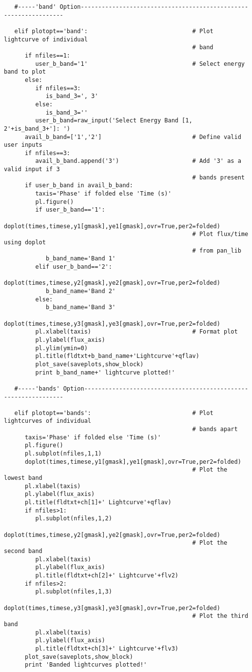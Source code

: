 \begin{verbatim}
   #-----'band' Option-----------------------------------------------------------------

   elif plotopt=='band':                              # Plot lightcurve of individual
                                                      # band
      if nfiles==1:
         user_b_band='1'                              # Select energy band to plot
      else:
         if nfiles==3:
            is_band_3=', 3'
         else:
            is_band_3=''
         user_b_band=raw_input('Select Energy Band [1, 2'+is_band_3+']: ')
      avail_b_band=['1','2']                          # Define valid user inputs
      if nfiles==3:
         avail_b_band.append('3')                     # Add '3' as a valid input if 3
                                                      # bands present
      if user_b_band in avail_b_band:
         taxis='Phase' if folded else 'Time (s)'
         pl.figure()
         if user_b_band=='1':
            doplot(times,timese,y1[gmask],ye1[gmask],ovr=True,per2=folded)
                                                      # Plot flux/time using doplot
                                                      # from pan_lib
            b_band_name='Band 1'
         elif user_b_band=='2':
            doplot(times,timese,y2[gmask],ye2[gmask],ovr=True,per2=folded)
            b_band_name='Band 2'
         else:
            b_band_name='Band 3'
            doplot(times,timese,y3[gmask],ye3[gmask],ovr=True,per2=folded)
         pl.xlabel(taxis)                             # Format plot
         pl.ylabel(flux_axis)
         pl.ylim(ymin=0)
         pl.title(fldtxt+b_band_name+'Lightcurve'+qflav)
         plot_save(saveplots,show_block)
         print b_band_name+' lightcurve plotted!'

   #-----'bands' Option----------------------------------------------------------------

   elif plotopt=='bands':                             # Plot lightcurves of individual
                                                      # bands apart
      taxis='Phase' if folded else 'Time (s)'
      pl.figure()
      pl.subplot(nfiles,1,1) 
      doplot(times,timese,y1[gmask],ye1[gmask],ovr=True,per2=folded)
                                                      # Plot the lowest band
      pl.xlabel(taxis)
      pl.ylabel(flux_axis)
      pl.title(fldtxt+ch[1]+' Lightcurve'+qflav)
      if nfiles>1:
         pl.subplot(nfiles,1,2)
         doplot(times,timese,y2[gmask],ye2[gmask],ovr=True,per2=folded)
                                                      # Plot the second band
         pl.xlabel(taxis)
         pl.ylabel(flux_axis)
         pl.title(fldtxt+ch[2]+' Lightcurve'+flv2)
      if nfiles>2:
         pl.subplot(nfiles,1,3)
         doplot(times,timese,y3[gmask],ye3[gmask],ovr=True,per2=folded)
                                                      # Plot the third band
         pl.xlabel(taxis)
         pl.ylabel(flux_axis)
         pl.title(fldtxt+ch[3]+' Lightcurve'+flv3)
      plot_save(saveplots,show_block)
      print 'Banded lightcurves plotted!'


\end{verbatim}
